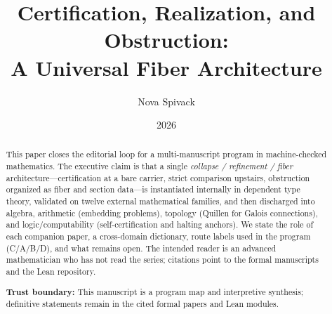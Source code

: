 \documentclass[11pt]{article}
\title{Certification, Realization, and Obstruction:\\[0.35em]
\large A Universal Fiber Architecture}
\author{Nova Spivack}
\date{2026}
\begin{document}
\maketitle
\NovaZenodoAfterTitle


\begin{abstract}
\raggedright
This paper closes the editorial loop for a multi-manuscript program in machine-checked
mathematics. The executive claim is that a single \emph{collapse / refinement / fiber}
architecture---certification at a bare carrier, strict comparison upstairs, obstruction
organized as fiber and section data---is instantiated internally in dependent type theory,
validated on twelve external mathematical families, and then discharged into algebra,
arithmetic (embedding problems), topology (Quillen for Galois connections), and
logic/computability (self-certification and halting anchors). We state the role of each
companion paper, a cross-domain dictionary, route labels used in the program (C/A/B/D),
and what remains open. The intended reader is an advanced mathematician who has not read
the series; citations point to the formal manuscripts and the Lean repository.

\textbf{Trust boundary:} This manuscript is a program map and interpretive synthesis; definitive statements remain in the cited formal papers and Lean modules.
\end{abstract}




\end{document}
